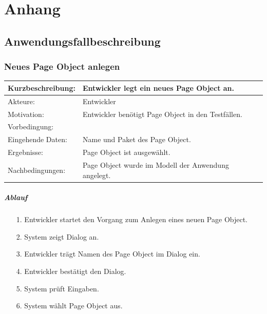 \appendix
\chapter{Anhang}
\section{Anwendungsfallbeschreibung}
\label{anhang:anwendungsfallbeschreibung}
\subsection{Neues Page Object anlegen}
\label{sec:neues_page_object_anlegen}

\begin{tabular}[h]{|p{4cm}|p{}|}
\hline 
\rule[-1ex]{0pt}{2.5ex}Kurzbeschreibung: & 
Entwickler legt ein neues Page Object an. \\  
\hline 
\rule[-1ex]{0pt}{2.5ex}Akteure: & 
Entwickler \\ 
\hline 
\rule[-1ex]{0pt}{2.5ex}Motivation: & 
Entwickler benötigt Page Object in den Testfällen. \\ 
\hline 
\rule[-1ex]{0pt}{2.5ex}Vorbedingung: &  \\ 
\hline 
\rule[-1ex]{0pt}{2.5ex}Eingehende Daten: & Name und Paket des Page Object. \\ 
\hline 
\rule[-1ex]{0pt}{2.5ex}Ergebnisse: & Page Object ist ausgewählt. \\ 
\hline 
\rule[-1ex]{0pt}{2.5ex}Nachbedingungen: & Page Object wurde im Modell der Anwendung angelegt.  \\ 
\hline 
\end{tabular} 

\paragraph{Ablauf}

\begin{itemize}[itemsep=0pt]
\item[1.] Entwickler startet den Vorgang zum Anlegen eines neuen Page Object. 
\item[2.] System zeigt Dialog an. 
\item[3.] Entwickler trägt Namen des Page Object im Dialog ein.
\item[4.] Entwickler bestätigt den Dialog.
\item[5.] System prüft Eingaben.
\item[6.] System wählt Page Object aus.
\end{itemize}

